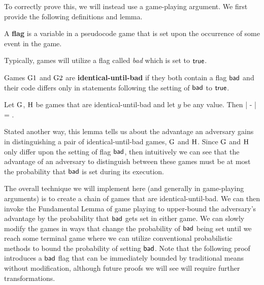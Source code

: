 To correctly prove this, we will instead use a game-playing argument. We first provide the following definitions and lemma. 

\begin{definition}
	A \textbf{flag} is a variable in a pseudocode game that is set upon the occurrence of some event in the game. 
\end{definition}

Typically, games will utilize a flag called \textit{bad} which is set to $\mathsf{true}$.  

\begin{definition}
	Games ${{\textnormal G}}1$ and ${{\textnormal G}}2$ are \textbf{identical-until-bad} if they both contain a flag $\mathsf{bad}$  and their code differs only in statements following the setting of $\mathsf{bad}$ to $\mathsf{true}$. 
\end{definition} 

\begin{lem}
	Let ${{\textnormal G}}$, ${{\textnormal H}}$ be games that are identical-until-bad and let $y$ be any
	value. Then
	\bnm
	\big|  
	-  \big| \le \Prob{\Hgame\setsbad} = \Prob{\G\setsbad}  \;.
	\enm
\end{lem}

Stated another way, this lemma tells us about the advantage an adversary gains in distinguishing a pair of identical-until-bad games, ${{\textnormal G}}$ and ${{\textnormal H}}$. Since ${{\textnormal G}}$ and ${{\textnormal H}}$ only differ upon the setting of flag $\mathsf{bad}$, then intuitively we can see that the advantage of an adversary to distinguish between these games must be at most the probability that $\mathsf{bad}$ is set during its execution.

The overall technique we will implement here (and generally in game-playing arguments) is to create a chain of games that are identical-until-bad. We can then invoke the Fundamental Lemma of game playing to upper-bound the adversary's advantage by the probability that $\mathsf{bad}$ gets set in either game. We can slowly modify the games in ways that change the probability of $\mathsf{bad}$ being set until we reach some terminal game where we can utilize conventional probabilistic methods to bound the probability of setting $\mathsf{bad}$. Note that the following proof introduces a $\mathsf{bad}$ flag that can be immediately bounded by traditional means without modification, although future proofs we will see will require further transformations. 

